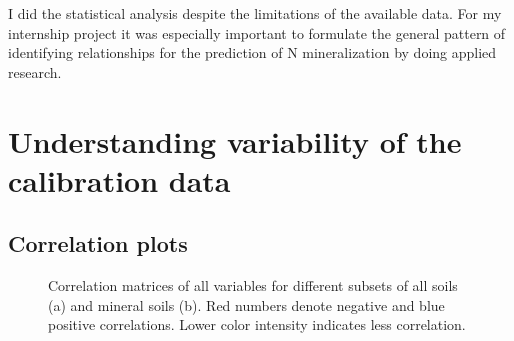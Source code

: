 \documentclass[10pt,twoside,dutch,english]{report}
\begin{document}
\begin{appendices}
   I did the statistical analysis despite the limitations of the available data. For my internship project it was especially important to formulate the general pattern of identifying relationships for the prediction of N mineralization by doing applied research.  

\chapter{Understanding variability of the calibration data}
\section{Correlation plots}
\label{chap:corr}

	\begin{figure}[h] %
	\centering
    	\caption{Correlation matrices of all variables for different subsets of all soils (a) and mineral soils (b). Red numbers denote negative and blue positive correlations. Lower color intensity indicates less correlation. }
	\label{fig:results_corr_min}
\end{figure}

\end{appendices}
\end{document}
